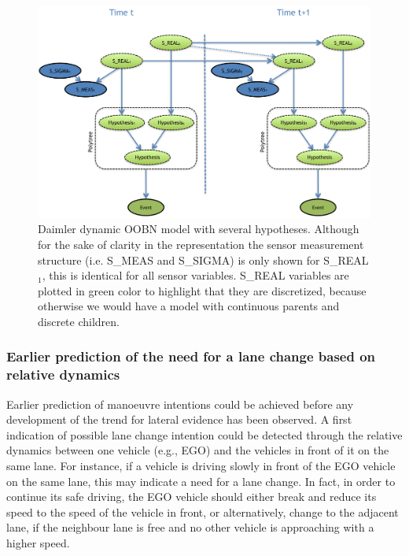 \begin{figure}[ht!]
\begin{center}
\includegraphics[scale=0.39]{./figures/DaimlerLEdynGeneric}
\end{center}
\caption{\label{Figure:daimlerLEdynGeneric}Daimler dynamic OOBN model with several hypotheses. Although for the sake of clarity in the representation the sensor measurement structure (i.e. S\_MEAS and S\_SIGMA) is only shown for S\_REAL$_1$, this is identical for all sensor variables. S\_REAL variables are plotted in green color to highlight that they are discretized, because otherwise we would have a model with continuous parents and discrete children.}
\end{figure}

\subsubsection{Earlier prediction of the need for a lane change based on relative dynamics}

Earlier prediction of manoeuvre intentions could be achieved before any development of the trend for lateral evidence has been observed. A first indication of possible lane change intention could be detected through the relative dynamics between one vehicle (e.g., EGO) and the vehicles in front of it on the same lane. For instance, if a vehicle is driving slowly in front of the EGO vehicle on the same lane, this may indicate a need for a lane change. In fact, in order to continue its safe driving, the EGO vehicle should either break and reduce its speed to the speed of the vehicle in front, or alternatively, change to the adjacent lane, if the neighbour lane is free and no other vehicle is approaching with a higher speed. 

